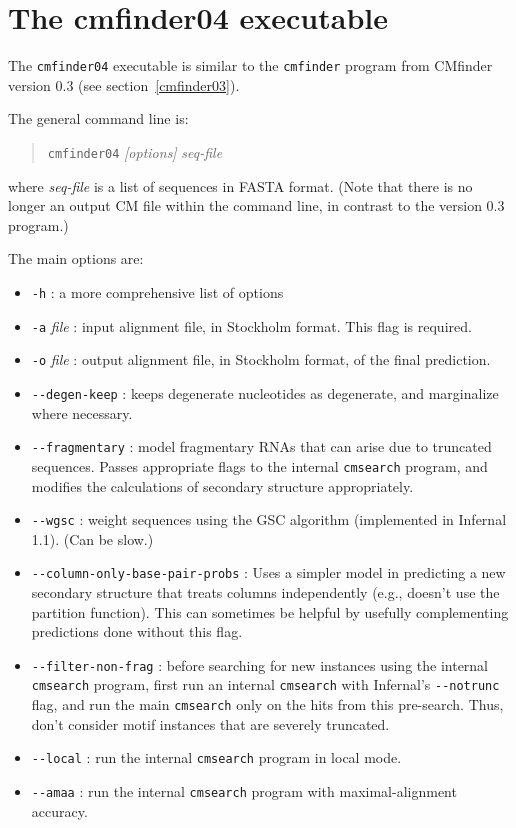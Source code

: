 \documentclass[letterpaper,12pt]{report}
\begin{document}
\section{The cmfinder04 executable}

The {\tt cmfinder04} executable is similar to the {\tt cmfinder} program from CMfinder version 0.3 (see section~\ref{cmfinder03}).

The general command line is:
\begin{quote}
{\tt cmfinder04} {\it [options]} {\it seq-file}
\end{quote}
where {\it seq-file} is a list of sequences in FASTA format. (Note that there is no longer an output CM file within the command line, in contrast to the version 0.3 program.)

The main options are:
\begin{itemize}
\item {\tt -h} : a more comprehensive list of options
\item {\tt -a} {\it file} : input alignment file, in Stockholm format.  This flag is required.
\item {\tt -o} {\it file} : output alignment file, in Stockholm format, of the final prediction.
\item {\tt -{}-degen-keep} : keeps degenerate nucleotides as degenerate, and marginalize where necessary.
\item {\tt -{}-fragmentary} : model fragmentary RNAs that can arise due to truncated sequences.  Passes appropriate flags to the internal {\tt cmsearch} program, and modifies the calculations of secondary structure appropriately.
\item {\tt -{}-wgsc} : weight sequences using the GSC algorithm (implemented in Infernal 1.1).  (Can be slow.)
\item {\tt -{}-column-only-base-pair-probs} : Uses a simpler model in predicting a new secondary structure that treats columns independently (e.g., doesn't use the partition function).  This can sometimes be helpful by usefully complementing predictions done without this flag.
\item {\tt -{}-filter-non-frag} : before searching for new instances using the internal {\tt cmsearch} program, first run an internal {\tt cmsearch} with Infernal's {\tt -{}-notrunc} flag, and run the main {\tt cmsearch} only on the hits from this pre-search.  Thus, don't consider motif instances that are severely truncated.
\item {\tt -{}-local} : run the internal {\tt cmsearch} program in local mode.
\item {\tt -{}-amaa} : run the internal {\tt cmsearch} program with maximal-alignment accuracy.
\end{itemize}
\end{document}
